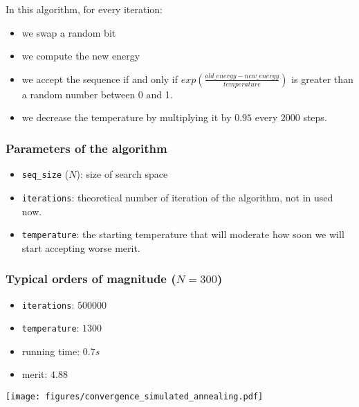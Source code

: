 \documentclass{article}
\begin{document}
  In this algorithm, for every iteration:

  \begin{itemize}
    \item we swap a random bit
    \item we compute the new energy
    \item we accept the sequence if and only if $exp(\frac{old\_energy-
      new\_energy}{temperature})$ is greater than a random number between 0 and
      1.
    \item we decrease the temperature by multiplying it by $0.95$ every $2000$
      steps.
  \end{itemize}

  \pagebreak

  \begin{multicols}{2}

    \subsubsection*{Parameters of the algorithm}
      \begin{itemize}
        \item \texttt{seq\_size} ($N$): size of search space
        \item \texttt{iterations}: theoretical number of iteration of the
          algorithm, not in used now.
        \item \texttt{temperature}: the starting temperature that will moderate
          how soon we will start accepting worse merit.
      \end{itemize}

    \subsubsection*{Typical orders of magnitude ($N = 300$)}
      \begin{itemize}
        \item \texttt{iterations}: $500000$
        \item \texttt{temperature}: $1300$
        \item running time: $0.7s$
        \item merit: $4.88$
      \end{itemize}

    \vphantom{0}

  \columnbreak

    \texttt{[image: figures/convergence\_simulated\_annealing.pdf]}

 \end{multicols}
\end{document}
